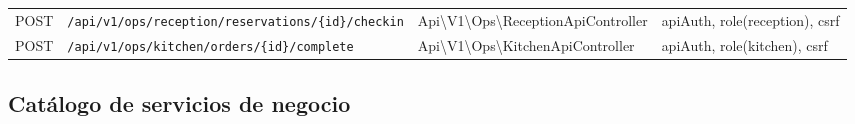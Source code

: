 \documentclass[12pt,a4paper,twoside,openright]{report}
\begin{document}
\begin{landscape}
\begin{longtable}{@{}llll@{}}
  POST & \texttt{/api/v1/ops/reception/reservations/\{id\}/checkin}& Api\textbackslash V1\textbackslash Ops\textbackslash ReceptionApiController & apiAuth, role(reception), csrf\\
  POST & \texttt{/api/v1/ops/kitchen/orders/\{id\}/complete}& Api\textbackslash V1\textbackslash Ops\textbackslash KitchenApiController & apiAuth, role(kitchen), csrf\\
\end{longtable}
\end{landscape}

\subsection{Catálogo de servicios de negocio}
\label{subsec:servicios}
\end{document}
